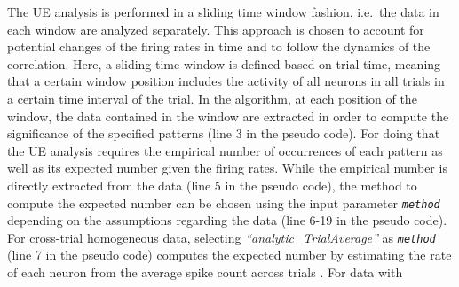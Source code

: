 \documentclass[10pt,a4paper,onecolumn]{article}
\begin{document}
The UE analysis is performed in a sliding time window fashion, i.e.~the
data in each window are analyzed separately. This approach is chosen to
account for potential changes of the firing rates in time and to follow
the dynamics of the correlation. Here, a sliding time window is defined
based on trial time, meaning that a certain window position includes the
activity of all neurons in all trials in a certain time interval of the
trial. In the algorithm, at each position of the window, the data
contained in the window are extracted in order to compute the
significance of the specified patterns (line 3 in the pseudo code). For
doing that the UE analysis requires the empirical number of occurrences
of each pattern as well as its expected number given the firing rates.
While the empirical number is directly extracted from the data (line 5
in the pseudo code), the method to compute the expected number can be
chosen using the input parameter \emph{\texttt{method}} depending on the
assumptions regarding the data (line 6-19 in the pseudo code). For
cross-trial homogeneous data, selecting
\emph{``analytic\_TrialAverage''} as \emph{\texttt{method}} (line 7 in
the pseudo code) computes the expected number by estimating the rate of
each neuron from the average spike count across trials
\autocites{Gruen02a}{Gruen02b}. For data with\\
\end{document}
